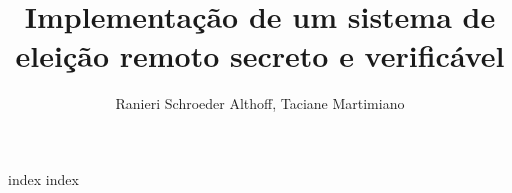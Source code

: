 \documentclass[12pt]{paper}
\title{Implementação de um sistema de eleição remoto secreto e verificável}
\author{Ranieri Schroeder Althoff\inst{1}, Taciane Martimiano\inst{1}}
\begin{document}
\maketitle

{index}
{index}

\printbibliography
\end{document}
